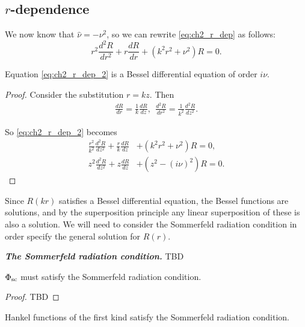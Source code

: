 \subsection{\texorpdfstring{$r$}{r}-dependence}
We now know that $\hat{\nu} = - \nu^2$, so we can rewrite \eqref{eq:ch2_r_dep} as follows:
    \begin{equation}\label{eq:ch2_r_dep_2}
        r^2 \frac{d^2 R}{dr^2} + r \frac{d R}{dr} + (k^2r^2 + \nu^2) R = 0.
    \end{equation}
    \begin{propn}
    Equation \eqref{eq:ch2_r_dep_2} is a Bessel differential equation of order $i\nu$.
    \end{propn}
    \begin{proof} Consider the substitution $r=kz$. Then
        \begin{align*}
            \frac{dR}{dr} = \frac{1}{k} \frac{dR}{dz}, ~~
            \frac{d^2R}{dr^2} = \frac{1}{k^2} \frac{d^2R}{dz^2}.
        \end{align*}\par
    So \eqref{eq:ch2_r_dep_2} becomes
        \begin{align}
            \frac{r^2}{k^2}\frac{d^2R}{dz^2}
                + \frac{r}{k}\frac{dR}{dz}
                &+ (k^2r^2 + \nu^2)R = 0, \\
            z^2 \frac{d^2 R}{dz^2}
                + z \frac{dR}{dz}
                &+ (z^2 - (i\nu)^2)R = 0.
        \end{align}
    \end{proof}\par
%
Since $R(kr)$ satisfies a Bessel differential equation, the Bessel functions are solutions, and by the superposition principle any linear superposition of these is also a solution. We will need to consider the Sommerfeld radiation condition in order specify the general solution for $R(r)$. \par
%
  \begin{defn}\textbf{\emph{The Sommerfeld radiation condition.}} \label{defn:sommerfeld_radiation_condition}TBD
  \end{defn}
%
  \begin{propn}
      $\Phi_{\text{sc}}$ must satisfy the Sommerfeld radiation condition.
  \end{propn}
  \begin{proof} TBD
  \end{proof}
%
  \begin{propn}
      Hankel functions of the first kind satisfy the Sommerfeld radiation condition.
  \end{propn}
